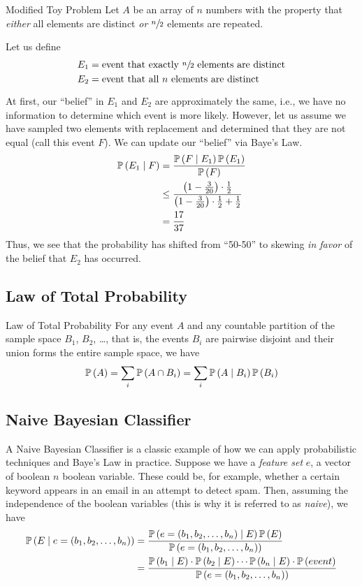 \begin{problem}{Modified Toy Problem}{}
    Let $A$ be an array of $n$ numbers with the property that \emph{either} all
    elements are distinct \emph{or} $\sfrac{n}{2}$ elements are repeated.
\end{problem}

Let us define
\begin{align*}
    E_1 &= \hbox{event that exactly $\sfrac{n}{2}$ elements are distinct}\\
    E_2 &= \hbox{event that all $n$ elements are distinct}
\end{align*}

At first, our ``belief'' in $E_1$ and $E_2$ are approximately the same, i.e., we
have no information to determine which event is more likely. However, let us
assume we have sampled two elements with replacement and determined that they
are not equal (call this event $F$). We can update our ``belief'' via Baye's
Law.
\begin{align*}\operatorname{\mathbb{P}}\left(E_1 \mid F\right)
    &= \frac{\operatorname{\mathbb{P}}\left(F \mid E_1\right) \operatorname{\mathbb{P}}\left(E_1\right)}{\operatorname{\mathbb{P}}\left(F\right)}\\
    &\leq \frac{\left(1 - \frac{3}{20}\right) \cdot \frac{1}{2}}{\left(1 - \frac{3}{20}\right) \cdot \frac{1}{2} + \frac{1}{2}}\\
    &= \frac{17}{37}
\end{align*}
Thus, we see that the probability has shifted from ``50-50'' to skewing \emph{in
favor} of the belief that $E_2$ has occurred.

\subsection{Law of Total Probability}
\begin{theorem}{Law of Total Probability}{}
    For any event $A$ and any countable partition of the sample space $B_1$,
    $B_2$, \dots, that is, the events $B_i$ are pairwise disjoint and their
    union forms the entire sample space, we have
    \[\operatorname{\mathbb{P}}\left(A\right) = \sum_i \operatorname{\mathbb{P}}\left(A \cap B_i\right) = \sum_i \operatorname{\mathbb{P}}\left(A \mid B_i\right) \operatorname{\mathbb{P}}\left(B_i\right)\]
\end{theorem}

\subsection{Naive Bayesian Classifier}
A Naive Bayesian Classifier is a classic example of how we can apply
probabilistic techniques and Baye's Law in practice. Suppose we have a
\emph{feature set} $e$, a vector of boolean $n$ boolean variable. These could
be, for example, whether a certain keyword appears in an email in an attempt to
detect spam. Then, assuming the independence of the boolean variables (this is
why it is referred to as \emph{naive}), we have
\begin{align*}\operatorname{\mathbb{P}}\left(E \mid e = (b_1, b_2, \dots, b_n)\right)
    &= \frac{\operatorname{\mathbb{P}}\left(e = (b_1, b_2, \dots, b_n) \mid E\right) \operatorname{\mathbb{P}}\left(E\right)}{\operatorname{\mathbb{P}}\left(e = (b_1, b_2, \dots, b_n)\right)}\\
    &= \frac{\operatorname{\mathbb{P}}\left(b_1 \mid E\right) \cdot \operatorname{\mathbb{P}}\left(b_2 \mid E\right) \cdots \operatorname{\mathbb{P}}\left(b_n \mid E\right) \cdot \operatorname{\mathbb{P}}\left(event\right)}{\operatorname{\mathbb{P}}\left(e = (b_1, b_2, \dots, b_n)\right)}
\end{align*}